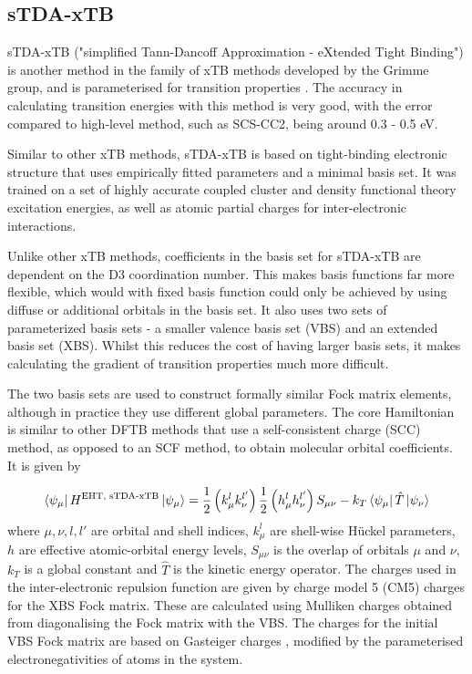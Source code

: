 \subsection{sTDA-xTB}
\label{subsec:stda_xtb}
sTDA-xTB ("simplified Tann-Dancoff Approximation - eXtended Tight Binding") is another
method in the family of xTB methods developed by the Grimme group, and is parameterised
for transition properties \cite{Grimme2016}. The accuracy in calculating transition energies with this
method is very good, with the error compared to high-level method, such as SCS-CC2,
being around 0.3 - 0.5 eV.

Similar to other xTB methods, sTDA-xTB is based on tight-binding electronic structure
that uses empirically fitted parameters and a minimal basis set. It was trained 
on a set of highly accurate coupled cluster and density functional theory excitation 
energies, as well as atomic partial charges for inter-electronic interactions.

Unlike other xTB methods, coefficients in the basis set for sTDA-xTB are dependent
on the D3 coordination number. This makes basis functions far more flexible, which 
would with fixed basis function could only be achieved by using diffuse or additional
orbitals in the basis set. It also uses two sets of parameterized basis sets - a
smaller valence basis set (VBS) and an extended basis set (XBS). Whilst this reduces
the cost of having larger basis sets, it makes calculating the gradient of transition
properties much more difficult.

The two basis sets are used to construct formally similar Fock matrix elements,
although in practice they use different global parameters. The core Hamiltonian
is similar to other DFTB methods that use a self-consistent charge (SCC) method, as
opposed to an SCF method, to obtain molecular orbital coefficients. It is given by

\begin{equation}
\bra{\psi_\mu} H^{\text{EHT, sTDA-xTB}} \ket{\psi_\mu}= \frac{1}{2} \left(k^l_\mu k^{l'}_\nu\right) \frac{1}{2} \left(h^l_\mu h^{l'}_\nu\right) S_{\mu\nu} - k_T \bra{\psi_\mu}\hat{T}\ket{\psi_\nu}
\end{equation}
%
where $\mu,\nu,l,l'$ are orbital and shell indices, $k^l_\mu$ are shell-wise 
H{\"u}ckel parameters, $h$ are effective atomic-orbital energy levels, $S_{\mu\nu}$
is the overlap of orbitals $\mu$ and $\nu$, $k_T$ is a global constant and $\hat{T}$
is the kinetic energy operator. The charges used in the inter-electronic repulsion 
function are given by charge model 5 (CM5) \cite{Marenich2012} charges for the XBS
Fock matrix. These are calculated using Mulliken charges obtained from diagonalising
the Fock matrix with the VBS. The charges for the initial VBS Fock matrix are based
on Gasteiger charges \cite{Gasteiger1978}, modified by the parameterised
electronegativities of atoms in the system.

